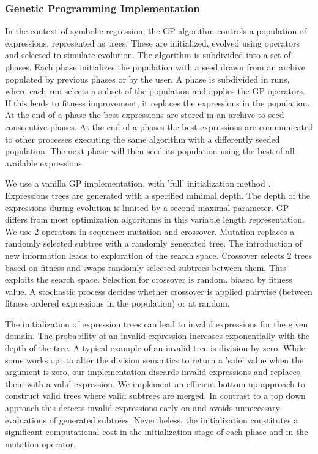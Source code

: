 \subsubsection{Genetic Programming Implementation}
In the context of symbolic regression, the GP algorithm controls a population of expressions, represented as trees. These are initialized, evolved using operators and selected to simulate evolution.
The algorithm is subdivided into a set of phases. Each phase initializes the population with a seed drawn from an archive populated by previous phases or by the user. A phase is subdivided in runs, where each run selects a subset of the population and applies the GP operators. If this leads to fitness improvement, it replaces the expressions in the population. At the end of a phase the best expressions are stored in an archive to seed consecutive phases. At the end of a phases the best expressions are communicated to other processes executing the same algorithm with a differently seeded population. The next phase will then seed its population using the best of all available expressions.

We use a vanilla GP implementation, with 'full' initialization method \cite{GP}. Expressions trees are generated with a specified minimal depth. The depth of the expressions during evolution is limited by a second maximal parameter. GP differs from most optimization algorithms in this variable length representation. 
We use 2 operators in sequence: mutation and crossover. Mutation replaces a randomly selected subtree with a randomly generated tree. The introduction of new information leads to exploration of the search space. Crossover selects 2 trees based on fitness and swaps randomly selected subtrees between them. This exploits the search space. Selection for crossover is random, biased by fitness value. A stochastic process decides whether crossover is applied pairwise (between fitness ordered expressions in the population) or at random.

The initialization of expression trees can lead to invalid expressions for the given domain. The probability of an invalid expression increases exponentially with the depth of the tree. A typical example of an invalid tree is division by zero. While some works opt to alter the division semantics to return a 'safe' value when the argument is zero, our implementation discards invalid expressions and replaces them with a valid expression. We implement an efficient bottom up approach to construct valid trees where valid subtrees are merged. In contrast to a top down approach this detects invalid expressions early on and avoids unnecessary evaluations of generated subtrees. Nevertheless, the initialization constitutes a significant computational cost in the initialization stage of each phase and in the mutation operator.
